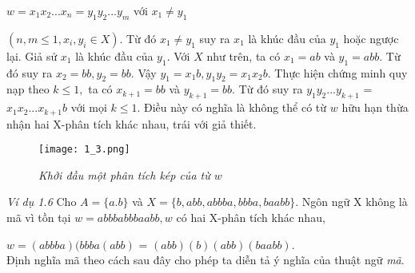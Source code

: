 $w = x_1x_2...x_n = y_1y_2...y_m$ với $x_1 \ne y_1$
\begin{flushleft}
$(n, m \le 1, x_i, y_i \in X )$. Từ đó $x_1 \ne y_1$ suy ra $x_1$ là khúc đầu của $y_1$ hoặc ngược lại. Giả sử $x_1$ là khúc đầu của $y_1$. Với $X$ như trên, ta có $x_1 = ab$ và $y_1 = abb$. Từ đó suy ra $x_2 = bb, y_2 = bb$. Vậy $y_1 = x_1b, y_1y_2 = x_1x_2b$. Thực hiện chứng minh quy nạp theo $k \le 1,$ ta có $x_{k+1} = bb$ và $y_{k+1} = bb$. Từ đó suy ra $y_1y_2...y_{k+1}$ = $x_1x_2...x_{k+1}b$ với mọi $k \le 1$. Điều này có nghĩa là không thể có từ $w$ hữu hạn thừa nhận hai X-phân tích khác nhau, trái với giả thiết. \\
\begin{figure}[ht]
    \texttt{[image: 1\_3.png]}
    \caption{ \textit{Khởi đầu một phân tích kép của từ $w$} }
\end{figure}
\textit{Ví dụ 1.6}  Cho $A = \{ a.b \}$ và $X = \{ b, abb, abbba, bbba, baabb \}$. Ngôn ngữ X không là mã vì tồn tại $w = abbbabbbaabb, w$ có hai X-phân tích khác nhau,
\end{flushleft}
$w = (abbba)(bbba(abb)$ = $(abb)(b)(abb)(baabb)$.\\
Định nghĩa mã theo cách sau đây cho phép ta diễn tả ý nghĩa của thuật ngữ \textit{mã}.
